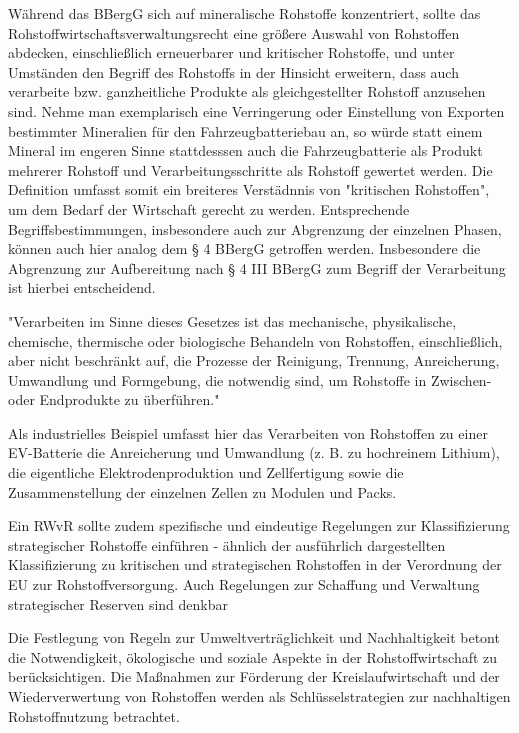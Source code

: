 \documentclass[12pt,a4paper,oneside]{book} %
\begin{document}
Während das BBergG sich auf mineralische Rohstoffe konzentriert, sollte das Rohstoffwirtschaftsverwaltungsrecht eine größere Auswahl von Rohstoffen abdecken, einschließlich erneuerbarer und kritischer Rohstoffe, und unter Umständen den Begriff des Rohstoffs in der Hinsicht erweitern, dass auch verarbeite bzw. ganzheitliche Produkte als gleichgestellter Rohstoff anzusehen sind. Nehme man exemplarisch eine Verringerung oder Einstellung von Exporten bestimmter Mineralien für den Fahrzeugbatteriebau an, so würde statt einem Mineral im engeren Sinne stattdesssen auch die Fahrzeugbatterie als Produkt mehrerer Rohstoff und Verarbeitungsschritte als Rohstoff gewertet werden. Die Definition umfasst somit ein breiteres Verstädnnis von "kritischen Rohstoffen", um dem Bedarf der Wirtschaft gerecht zu werden. Entsprechende Begriffsbestimmungen, insbesondere auch zur Abgrenzung der einzelnen Phasen, können auch hier analog dem § 4 BBergG getroffen werden. Insbesondere die Abgrenzung zur Aufbereitung nach § 4 III BBergG zum Begriff der Verarbeitung ist hierbei entscheidend.

"Verarbeiten im Sinne dieses Gesetzes ist das mechanische, physikalische, chemische, thermische oder biologische Behandeln von Rohstoffen, einschließlich, aber nicht beschränkt auf, die Prozesse der Reinigung, Trennung, Anreicherung, Umwandlung und Formgebung, die notwendig sind, um Rohstoffe in Zwischen- oder Endprodukte zu überführen."

Als industrielles Beispiel umfasst hier das Verarbeiten von Rohstoffen zu einer EV-Batterie die Anreicherung und Umwandlung (z. B. zu hochreinem Lithium), die eigentliche Elektrodenproduktion und Zellfertigung sowie die Zusammenstellung der einzelnen Zellen zu Modulen und Packs.

Ein RWvR sollte zudem spezifische und eindeutige Regelungen zur Klassifizierung strategischer Rohstoffe einführen - ähnlich der ausführlich dargestellten Klassifizierung zu kritischen und strategischen Rohstoffen in der Verordnung der EU zur Rohstoffversorgung. Auch Regelungen zur Schaffung und Verwaltung strategischer Reserven sind denkbar  %

Die Festlegung von Regeln zur Umweltverträglichkeit und Nachhaltigkeit betont die Notwendigkeit, ökologische und soziale Aspekte in der Rohstoffwirtschaft zu berücksichtigen.
Die Maßnahmen zur Förderung der Kreislaufwirtschaft und der Wiederverwertung von Rohstoffen werden als Schlüsselstrategien zur nachhaltigen Rohstoffnutzung betrachtet.
\end{document}

